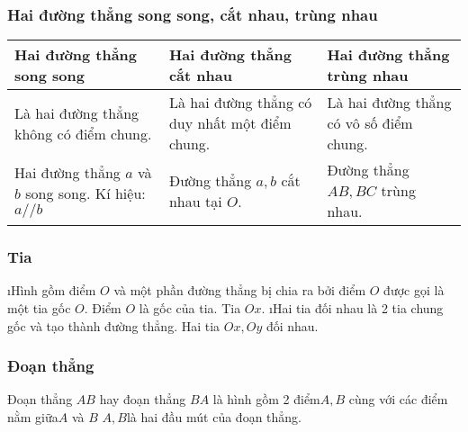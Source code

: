\subsubsection{Hai đường thẳng song song, cắt nhau, trùng nhau}
\begin{center}
	\begin{tabularx}{\textwidth}{|*{3}{Y|} }
		\hline
		Hai đường thẳng song song&	Hai đường thẳng cắt nhau&	Hai đường thẳng trùng nhau\\
		\hline
		Là hai đường thẳng không có điểm chung.& Là hai đường thẳng có duy nhất một điểm chung. & Là hai đường thẳng có vô số điểm chung.\\
%			
%			
%			
		Hai đường thẳng $a$ và $b$ song song.
		Kí hiệu: $a//b$ & Đường thẳng $a,b$ cắt nhau tại $O$. & Đường thẳng $AB,BC$ trùng nhau.\\
		\hline
	\end{tabularx}
\end{center}
\subsubsection{Tia}
\begin{enumerate}[--,leftmargin=*]
\i Hình gồm điểm $O$ và một phần đường thẳng bị chia ra bởi điểm $O$ được gọi là một tia gốc $O$. 
Điểm $O$ là gốc của tia.	
%		
Tia $Ox$.
\i Hai tia đối nhau là 2 tia chung gốc và tạo thành đường thẳng.
%		
Hai tia $Ox,Oy$ đối nhau.
\end{enumerate}
\subsubsection{Đoạn thẳng}
Đoạn thẳng $AB$ hay đoạn thẳng $BA$ là hình gồm 2 điểm$ A,B$ cùng với các điểm nằm giữa$ A$ và $B$
%		
$A,B$là hai đầu mút của đoạn thẳng.

